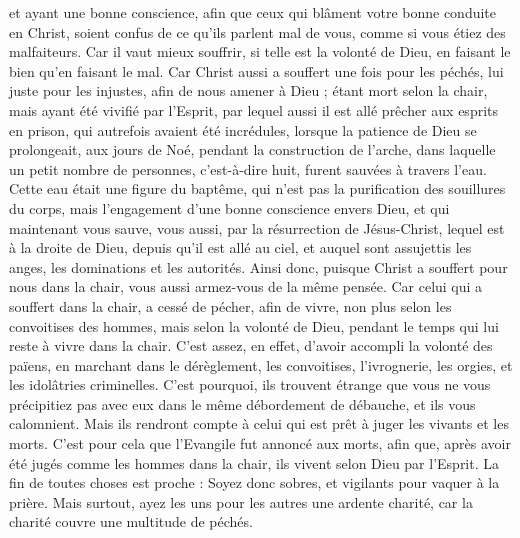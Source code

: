\begin{multicols}{2}
et ayant une bonne conscience, afin que ceux qui blâment votre bonne conduite en Christ, soient confus de ce qu'ils parlent mal de vous, comme si vous étiez des malfaiteurs.
Car il vaut mieux souffrir, si telle est la volonté de Dieu, en faisant le bien qu’en faisant le mal.
Car Christ aussi a souffert une fois pour les péchés, lui juste pour les injustes, afin de nous amener à Dieu ; étant mort selon la chair, mais ayant été vivifié par l'Esprit,
par lequel aussi il est allé prêcher aux esprits en prison{},
qui autrefois avaient été incrédules, lorsque la patience de Dieu se prolongeait, aux jours de Noé, pendant la construction de l'arche, dans laquelle un petit nombre de personnes, c’est-à-dire huit, furent sauvées à travers l'eau.
Cette eau était une figure du baptême, qui n’est pas la purification des souillures du corps, mais l’engagement d’une bonne conscience envers Dieu, et qui maintenant vous sauve, vous aussi, par la résurrection de Jésus-Christ,
lequel est à la droite de Dieu, depuis qu’il est allé au ciel, et auquel sont assujettis les anges, les dominations et les autorités.
\VerseOne{}Ainsi donc, puisque Christ a souffert pour nous dans la chair, vous aussi armez-vous de la même pensée. Car celui qui a souffert dans la chair, a cessé de pécher,
afin de vivre, non plus selon les convoitises des hommes, mais selon la volonté de Dieu, pendant le temps qui lui reste à vivre dans la chair.
C’est assez, en effet, d’avoir accompli la volonté des païens, en marchant dans le dérèglement, les convoitises, l’ivrognerie, les orgies, et les idolâtries criminelles.
C’est pourquoi, ils trouvent étrange que vous ne vous précipitiez pas avec eux dans le même débordement de débauche, et ils vous calomnient.
Mais ils rendront compte à celui qui est prêt à juger les vivants et les morts.
C’est pour cela que l’Evangile fut annoncé aux morts, afin que, après avoir été jugés comme les hommes dans la chair, ils vivent selon Dieu par l'Esprit.
La fin de toutes choses est proche : Soyez donc sobres, et vigilants pour vaquer à la prière.
Mais surtout, ayez les uns pour les autres une ardente charité, car la charité couvre une multitude de péchés.

\end{multicols}
